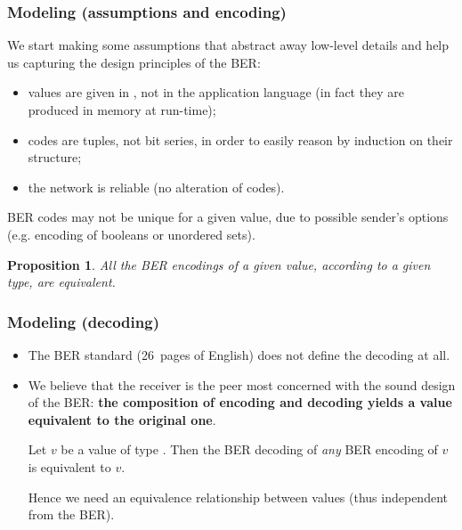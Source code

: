 \documentclass[compress,dvips,xcolor={dvipsnames},t]{beamer}
\newtheorem{proposition}{Proposition}
\begin{document}
\begin{frame}
\frametitle{Modeling (assumptions and encoding)}

\vspace*{-6pt}

We start making some assumptions that abstract away low-level details
and help us capturing the design principles of the BER:

\begin{itemize}

  \item values are given in \ASN, not in the application language (in
  fact they are produced in memory at run-time);

  \item codes are tuples, not bit series, in order to easily reason by
  induction on their structure;

  \item the network is reliable (no alteration of codes).

\end{itemize}

BER codes may not be unique for a given value, due to possible
sender's options (e.g. encoding of booleans or unordered sets).

\begin{proposition}
All the BER encodings of a given value, according to a given type, are
equivalent.
\end{proposition}

\end{frame}

%
\begin{frame}
\frametitle{Modeling (decoding)}

\begin{itemize}

  \item The BER standard (26~pages of English) does not define the
  decoding at all.

  \item We believe that the receiver is the peer most concerned with
  the sound design of the BER: \textbf{the composition of encoding and
  decoding yields a value equivalent to the original one}.

  \begin{theorem}[Soundness]
    Let $v$ be a value of type \T. Then the BER decoding of \emph{any}
    BER encoding of $v$ is equivalent to $v$.
  \end{theorem}

  Hence we need an equivalence relationship between values
  (thus independent from the BER).

\end{itemize}

\end{frame}
\end{document}
